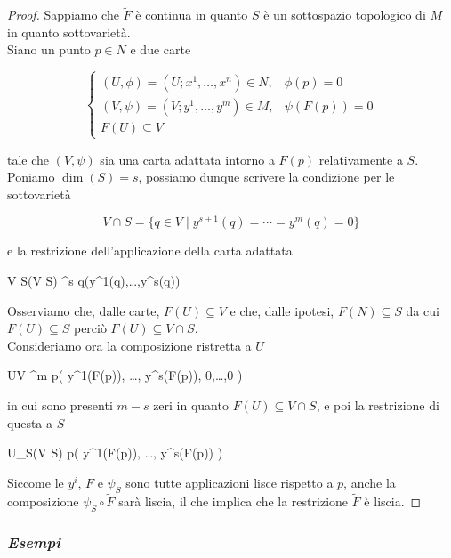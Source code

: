 \begin{proof}
	Sappiamo che $ \tilde{F} $ è continua in quanto $ S $ è un sottospazio topologico di $ M $ in quanto sottovarietà.\\
	Siano un punto $ p \in N $ e due carte
	
	\begin{equation}
		\begin{cases}
			(U,\phi) = (U; x^{1},\dots,x^{n}) \in N, & \phi(p) = 0 \\
			(V,\psi) = (V; y^{1},\dots,y^{m}) \in M, & \psi(F(p)) = 0 \\
			F(U) \subseteq V
		\end{cases}
	\end{equation}
	
	tale che $ (V,\psi) $ sia una carta adattata intorno a $ F(p) $ relativamente a $ S $.\\
	Poniamo $ \dim(S) = s $, possiamo dunque scrivere la condizione per le sottovarietà
	
	\begin{equation}
		V \cap S = \{ q \in V \mid y^{s+1}(q) = \cdots = y^{m}(q) = 0 \}
	\end{equation}
	
	e la restrizione dell'applicazione della carta adattata
	
		{V \cap S}{\psi(V \cap S) \subset \R^{s}}
		{q}{(y^{1}(q),\dots,y^{s}(q))}

	Osserviamo che, dalle carte, $ F(U) \subseteq V $ e che, dalle ipotesi, $ F(N) \subseteq S $ da cui $ F(U) \subseteq S $ perciò $ F(U) \subseteq V \cap S $.\\
	Consideriamo ora la composizione ristretta a $ U $
	
		{U}{V \subset \R^{m}}
		{p}{\left( y^{1}(F(p)), \dots, y^{s}(F(p)), 0,\dots,0 \right)}

	in cui sono presenti $ m - s $ zeri in quanto $ F(U) \subseteq V \cap S $, e poi la restrizione di questa a $ S $
	
		{U}{\psi_{S}(V \cap S)}
		{p}{\left( y^{1}(F(p)), \dots, y^{s}(F(p)) \right)}

	Siccome le $ y^{i} $, $ F $ e $ \psi_{S} $ sono tutte applicazioni lisce rispetto a $ p $, anche la composizione $ \psi_{S} \circ \tilde{F} $ sarà liscia, il che implica che la restrizione $ \tilde{F} $ è liscia.
\end{proof}

\subsubsection{\textit{Esempi}}

